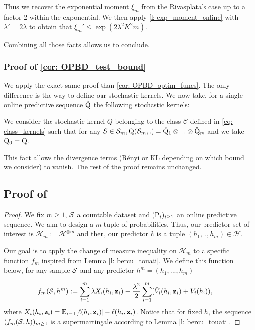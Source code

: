 \begin{noaddcontents}
Thus we recover the exponential moment $\xi_m$ from the Rivasplata's case up to a factor 2 within the exponential. We then apply \cref{l: exp_moment_online} with $\lambda'= 2\lambda$ to obtain that $\xi_m'\leq \exp\left(  2\lambda^2K^2m \right)$.


Combining all those facts allows us to conclude.




\subsubsection{Proof of \cref{cor: OPBD_test_bound}}

We apply the exact same proof than \cref{cor: OPBD_optim_funcs}. The only difference is the way to define our stochastic kernels. We now take, for a single online predictive sequence $\hat{\Q}$ the following stochastic kernels:

We consider the stochastic kernel $Q$ belonging to the class $\mathcal{C}$ defined in \cref{eq: class_kernels} such that for any $S\in\Sm, \Q(\Sm,.) = \hat{\Q}_1\otimes ... \otimes \hat{\Q}_{m}$ and we take $\Q_0=\Q$.

This fact allows the divergence terms (Rényi or KL depending on which bound we consider) to vanish. The rest of the proof remains unchanged.

\subsection{Proof of }
\label{sec: proof_main_thm_online-ht}
 \begin{proof}
   We fix $m\geq 1$, $\S$ a countable dataset and $(\P_{i})_{i\geq 1}$ an online predictive sequence. We aim to design a $m$-tuple of probabilities. Thus, our predictor set of interest is $\mathcal{H}_m:= \mathcal{H}^{\otimes m}$ and then, our predictor $h$ is a tuple $(h_1,..,h_m)\in\mathcal{H}$.

   Our goal is to apply the change of measure inequality on $\mathcal{H}_m$ to a specific function $f_m$ inspired from Lemma \ref{l: bercu_touati}. We define this function below, for any sample $\S$ and any predictor $h^m=(h_1,...,h_m)$

   \begin{align*}
   f_m(\S,h^m) & := \sum_{i=1}^m \lambda X_i(h_i,\z_i)  - \frac{\lambda^2}{2}\sum_{i=1}^m(\hat{V}_i(h_i,\z_i) + V_i(h_i)),
   \end{align*}
   where $X_i(h_i,\z_i)= \mathbb{E}_{i-1}[\ell(h_i,\z_i)]- \ell(h_i,\z_i)$. Notice that for fixed $h$, the sequence $(f_m(\S,h))_{m\geq 1}$ is a supermartingale according to Lemma \ref{l: bercu_touati}.


\end{proof}
\end{noaddcontents}
